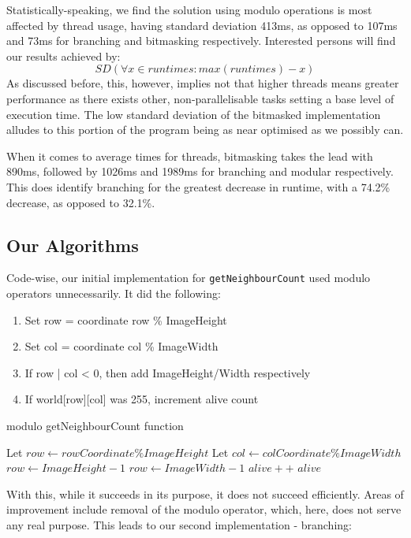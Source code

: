 \documentclass[twoside,twocolumn]{article}
\begin{document}
Statistically-speaking, we find the solution using 
modulo operations is most affected by thread usage, having standard deviation 413ms, as opposed to 107ms 
and 73ms for branching and bitmasking respectively. Interested persons will find our results achieved by:
\[SD(\forall x \in runtimes : max(runtimes) - x)\]
As discussed before, this, however, implies not that higher threads means greater 
performance as there exists other, non-parallelisable tasks setting a base level of execution time. 
The low standard deviation of the bitmasked implementation alludes to this portion of the program being as 
near optimised as we possibly can. 

When it comes to average times for threads, bitmasking takes the lead with
890ms, followed by 1026ms and 1989ms for branching and modular respectively. This does identify branching for the 
greatest decrease in runtime, with a 74.2\% decrease, as opposed to 32.1\%.

\subsection{Our Algorithms}

Code-wise, our initial implementation for \texttt{getNeighbourCount} used modulo operators unnecessarily. It did the following:
\begin{enumerate}[noitemsep]
  \item Set row = coordinate row \% ImageHeight
  \item Set col = coordinate col \% ImageWidth
  \item If row | col < 0, then add ImageHeight/Width respectively
  \item If world[row][col] was 255, increment alive count
\end{enumerate}

\begin{algorithm}
  \caption{modulo getNeighbourCount function}
  \begin{algorithmic}
    \State Let $row \gets rowCoordinate \% ImageHeight$
    \State Let $col \gets colCoordinate \% ImageWidth$
    \State $row \gets ImageHeight - 1$
    \State $row \gets ImageWidth - 1$ 
    \EndIf
    \State $alive++$
    \EndIf
    \State \Return $alive$
  \end{algorithmic}
\end{algorithm}

With this, while it succeeds in its purpose, it does not
succeed efficiently. Areas of improvement include removal of the modulo operator, which, here,
does not serve any real purpose. This leads to our second implementation - branching:
\end{document}
